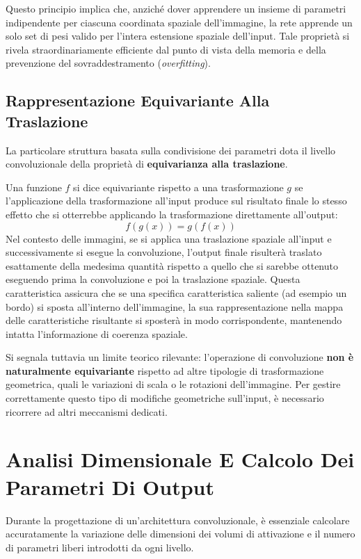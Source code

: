 ﻿\documentclass[11pt, a4paper]{article}
\begin{document}
Questo principio implica che, anziché dover apprendere un insieme di parametri indipendente per ciascuna coordinata spaziale dell'immagine, la rete apprende un solo set di pesi valido per l'intera estensione spaziale dell'input. Tale proprietà si rivela straordinariamente efficiente dal punto di vista della memoria e della prevenzione del sovraddestramento (\emph{overfitting}).

\subsection{Rappresentazione Equivariante Alla Traslazione}

La particolare struttura basata sulla condivisione dei parametri dota il livello convoluzionale della proprietà di \textbf{equivarianza alla traslazione}.

Una funzione $f$ si dice equivariante rispetto a una trasformazione $g$ se l'applicazione della trasformazione all'input produce sul risultato finale lo stesso effetto che si otterrebbe applicando la trasformazione direttamente all'output:
\[
f(g(x)) = g(f(x))
\]
Nel contesto delle immagini, se si applica una traslazione spaziale all'input e successivamente si esegue la convoluzione, l'output finale risulterà traslato esattamente della medesima quantità rispetto a quello che si sarebbe ottenuto eseguendo prima la convoluzione e poi la traslazione spaziale. Questa caratteristica assicura che se una specifica caratteristica saliente (ad esempio un bordo) si sposta all'interno dell'immagine, la sua rappresentazione nella mappa delle caratteristiche risultante si sposterà in modo corrispondente, mantenendo intatta l'informazione di coerenza spaziale.

Si segnala tuttavia un limite teorico rilevante: l'operazione di convoluzione \textbf{non è naturalmente equivariante} rispetto ad altre tipologie di trasformazione geometrica, quali le variazioni di scala o le rotazioni dell'immagine. Per gestire correttamente questo tipo di modifiche geometriche sull'input, è necessario ricorrere ad altri meccanismi dedicati.

\newpage

\section{Analisi Dimensionale E Calcolo Dei Parametri Di Output}

Durante la progettazione di un'architettura convoluzionale, è essenziale calcolare accuratamente la variazione delle dimensioni dei volumi di attivazione e il numero di parametri liberi introdotti da ogni livello.
\end{document}
